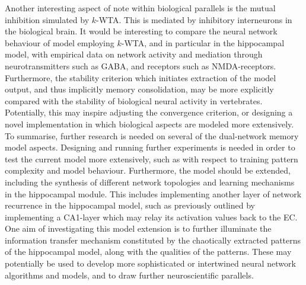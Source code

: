 Another interesting aspect of note within biological parallels is the mutual inhibition simulated by $k$-WTA. This is mediated by inhibitory interneurons in the biological brain. It would be interesting to compare the neural network behaviour of model employing $k$-WTA, and in particular in the hippocampal model, with empirical data on network activity and mediation through neurotransmitters such as GABA, and receptors such as NMDA-receptors. 
Furthermore, the stability criterion which initiates extraction of the model output, and thus implicitly memory consolidation, may be more explicitly compared with the stability of biological neural activity in vertebrates. Potentially, this may inspire adjusting the convergence criterion, or designing a novel implementation in which biological aspects are modeled more extensively.
\\

To summarise, further research is needed on several of the dual-network memory model aspects. Designing and running further experiments is needed in order to test the current model more extensively, such as with respect to training pattern complexity and model behaviour. Furthermore, the model should be extended, including the synthesis of different network topologies and learning mechanisms in the hippocampal module. This includes implementing another layer of network recurrence in the hippocampal model, such as previously outlined by implementing a CA1-layer which may relay its activation values back to the EC.
One aim of investigating this model extension is to further illuminate the information transfer mechanism constituted by the chaotically extracted patterns of the hippocampal model, along with the qualities of the patterns. These may potentially be used to develop more sophisticated or intertwined neural network algorithms and models, and to draw further neuroscientific parallels.







\cleardoublepage